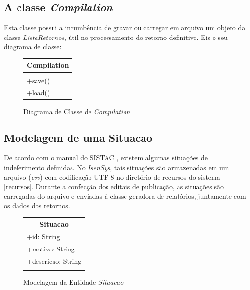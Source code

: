 \documentclass[
	12pt,			%
	openright,		%
	oneside,	
	a4paper,		%
	english,		%
	brazil			%
]{abntex2/abntex2}  %
\begin{document}
			\subsection{A classe \textit{Compilation}} \label{compilation}
	
				Esta classe possui a incumbência de gravar ou carregar em arquivo um objeto da classe \textit{ListaRetornos}, útil no processamento do retorno definitivo. Eis o seu diagrama de classe:
	
				\begin{figure}[ht]
					\begin{center}
						
						\caption{Diagrama de Classe de \textit{Compilation}}
						\label{compilation-uml}
						
						\begin{tabular}{|l|}
						\hline
						\multicolumn{1}{|c|}{\textbf{Compilation}} \\ \hline
						\\ \hline
						+save()                                    \\
						+load()                                    \\ \hline
						\end{tabular}
						
					\end{center}
				\end{figure}
	
			\subsection{Modelagem de uma Situacao}
	
				De acordo com o manual do SISTAC \cite{sistac-formatos}, existem algumas situações de indeferimento definidas. No \textit{IsenSys}, tais situações são armazenadas em um arquivo (\textit{csv}) com codificação UTF-8 no diretório de recursos do sistema \ref{recursos}. Durante a confecção dos editais de publicação, as situações são carregadas do arquivo e enviadas à classe geradora de relatórios, juntamente com os dados dos retornos.
	
				\begin{figure}[ht]
					\begin{center}
						
						\caption{Modelagem da Entidade \textit{Situacao}}
						\label{situacao-uml}
						
						\begin{tabular}{|l|}
							\hline
							\multicolumn{1}{|c|}{\textbf{Situacao}} \\ \hline
							+id: String                             \\
							+motivo: String                         \\
							+descricao: String                      \\ \hline
							                                        \\ \hline
						\end{tabular}
						
					\end{center}
				\end{figure}
	
\end{document}
